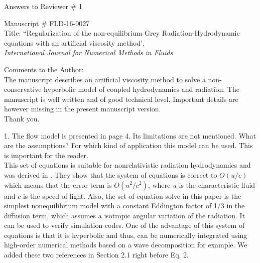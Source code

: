 \documentclass{article}
\begin{document}
\begin{center}
{ \Large Answers to Reviewer \# 1}
\end{center}

\bigskip

\noindent Manuscript \# FLD-16-0027 \\
Title: ``Regularization of the non-equilibrium Grey Radiation-Hydrodynamic equations with an artificial viscosity method', \\
{\it International Journal for Numerical Methods in Fluids}\\

\bigskip
\bigskip

{\color{blue}
Comments to the Author: \\ 
The manuscript describes an artificial viscosity method to solve a non-conservative hyperbolic model of coupled hydrodynamics and radiation. The manuscript is well written and of good technical level.
Important details are however missing in the present manuscript version.\\}
Thank you.
\bigskip

{\color{blue}
1. The flow model is presented in page 4. Its limitations are not mentioned. What are the assumptions? For which kind of application this model can be used. This is important for the reader. \\}
This set of equations is suitable for nonrelativistic radiation hydrodynamics and was derived in \cite{LowrieMorelHittinger, LowrieMorel}. They show that the system of equations is correct to $O(u/c)$ which means that the error term is $O(u^2/c^2)$, where $u$ is the characteristic fluid and $c$ is the speed of light. Also, the set of equation solve in this paper is the simplest nonequilibrium model with a constant Eddington factor of 1/3 in the diffusion term, which assumes a isotropic angular variation of the radiation. It can be used to verify simulation codes. One of the advantage of this system of equations is that it is hyperbolic and thus,  can be numerically integrated using high-order numerical methods based on a wave decomposition for example. We added these two references in Section 2.1 right before Eq. 2. 
\bigskip
\end{document}
